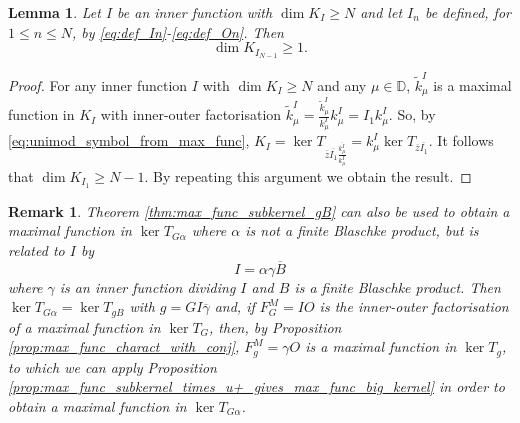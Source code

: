 \documentclass{article}
\numberwithin{equation}{section}
\theoremstyle{plain}
\newtheorem{lem}[thm]{Lemma}
\newtheorem{rem}[thm]{Remark}
\newcommand{\DD}{\ensuremath{\mathbb{D}}}
\newcommand{\ol}[1]{\ensuremath{\overline{#1}}}
\begin{document}
\begin{lem}
\label{lem:dim_K_In}
Let $I$ be an inner function with $\dim K_I \geq N$ and let $I_n$ be defined, for $1 \leq n \leq N$, by \eqref{eq:def_In}-\eqref{eq:def_On}.
Then
\begin{equation}
\dim K_{I_{N-1}} \geq 1.
\end{equation}
\end{lem}


\begin{proof}
For any inner function $I$ with $\dim K_I \geq N$ and any $\mu\in\DD$, $\tilde k^I_\mu$ is a maximal function in $K_I$ with inner-outer factorisation $\tilde k^I_\mu = \frac{\tilde k^I_\mu}{k^I_\mu} k^I_\mu = I_1 k^I_\mu$.
So, by \eqref{eq:unimod_symbol_from_max_func}, $K_I = \ker T_{\ol z \ol{I_1} \frac{\ol{k^I_\mu}}{k^I_\mu}} = k^I_\mu \ker T_{\ol z \ol{I_1}}$.
It follows that $\dim K_{I_1} \geq N-1$.
By repeating this argument we obtain the result.
\end{proof}


\begin{rem}
Theorem \ref{thm:max_func_subkernel_gB} can also be used to obtain a maximal function in $\ker T_{G \alpha}$ where $\alpha$ is not a finite Blaschke product, but is related to $I$ by
\begin{equation}
I = \alpha \gamma \ol B
\end{equation}
where $\gamma$ is an inner function dividing $I$ and $B$ is a finite Blaschke product.
Then $\ker T_{G \alpha} = \ker T_{g B}$ with $g = G I \ol\gamma$ and, if $F^M_G = IO$ is the inner-outer factorisation of a maximal function in $\ker T_G$, then, by Proposition \ref{prop:max_func_charact_with_conj}, $F^M_g = \gamma O$ is a maximal function in $\ker T_g$, to which we can apply Proposition \ref{prop:max_func_subkernel_times_u+_gives_max_func_big_kernel} in order to obtain a maximal function in $\ker T_{G \alpha}$.
\end{rem}
\end{document}
